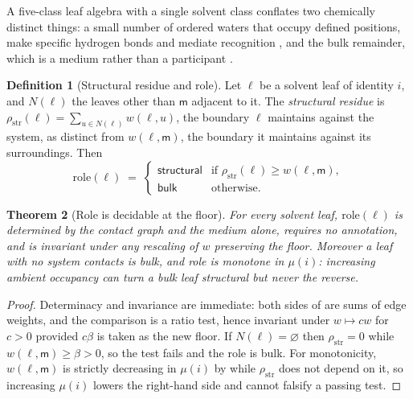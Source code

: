\documentclass[11pt,twocolumn,a4paper]{article}
\theoremstyle{thmstyle}
\newtheorem{theorem}{Theorem}[section]
\theoremstyle{definition}
\newtheorem{definition}[theorem]{Definition}
\theoremstyle{remark}
\newcommand{\med}{\mathsf{m}}
\newcommand{\flo}{\beta}
\begin{document}
A five-class leaf algebra with a single \textsf{solvent} class conflates two
chemically distinct things: a small number of ordered waters that occupy
defined positions, make specific hydrogen bonds and mediate recognition
\citep{levy2006,creighton1993}, and the bulk remainder, which is a medium
rather than a participant \citep{ball2008}.

\begin{definition}[Structural residue and role]
\label{def:role}
Let $\ell$ be a solvent leaf of identity $i$, and $N(\ell)$ the leaves other
than $\med$ adjacent to it. The \emph{structural residue} is
$\rho_{\mathrm{str}}(\ell)=\sum_{u \in N(\ell)} w(\ell,u)$, the boundary
$\ell$ maintains against the system, as distinct from $w(\ell,\med)$, the
boundary it maintains against its surroundings. Then
\begin{equation}
\mathrm{role}(\ell) \;=\;
\begin{cases}
\textsf{structural} & \text{if } \rho_{\mathrm{str}}(\ell) \geq w(\ell,\med),\\
\textsf{bulk} & \text{otherwise.}
\end{cases}
\label{eq:role}
\end{equation}
\end{definition}

\begin{theorem}[Role is decidable at the floor]
\label{thm:role}
For every solvent leaf, $\mathrm{role}(\ell)$ is determined by the contact
graph and the medium alone, requires no annotation, and is invariant under any
rescaling of $w$ preserving the floor. Moreover a leaf with no system contacts
is \textsf{bulk}, and role is monotone in $\mu(i)$: increasing ambient
occupancy can turn a bulk leaf structural but never the reverse.
\end{theorem}

\begin{proof}
Determinacy and invariance are immediate: both sides of  are
sums of edge weights, and the comparison is a ratio test, hence invariant
under $w \mapsto cw$ for $c>0$ provided $c\flo$ is taken as the new floor. If
$N(\ell)=\varnothing$ then $\rho_{\mathrm{str}}=0$ while
$w(\ell,\med)\geq\flo>0$, so the test fails and the role is \textsf{bulk}. For
monotonicity, $w(\ell,\med)$ is strictly decreasing in $\mu(i)$ by
 while $\rho_{\mathrm{str}}$ does not depend on it, so
increasing $\mu(i)$ lowers the right-hand side and cannot falsify a passing
test.
\end{proof}
\end{document}
